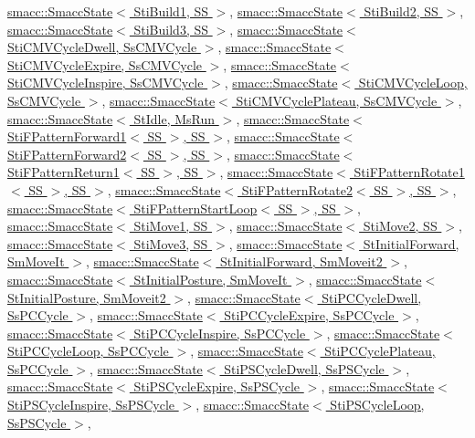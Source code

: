 \hyperlink{classsmacc_1_1SmaccState}{smacc\+::\+Smacc\+State$<$ Sti\+Build1, S\+S $>$}, \hyperlink{classsmacc_1_1SmaccState}{smacc\+::\+Smacc\+State$<$ Sti\+Build2, S\+S $>$}, \hyperlink{classsmacc_1_1SmaccState}{smacc\+::\+Smacc\+State$<$ Sti\+Build3, S\+S $>$}, \hyperlink{classsmacc_1_1SmaccState}{smacc\+::\+Smacc\+State$<$ Sti\+C\+M\+V\+Cycle\+Dwell, Ss\+C\+M\+V\+Cycle $>$}, \hyperlink{classsmacc_1_1SmaccState}{smacc\+::\+Smacc\+State$<$ Sti\+C\+M\+V\+Cycle\+Expire, Ss\+C\+M\+V\+Cycle $>$}, \hyperlink{classsmacc_1_1SmaccState}{smacc\+::\+Smacc\+State$<$ Sti\+C\+M\+V\+Cycle\+Inspire, Ss\+C\+M\+V\+Cycle $>$}, \hyperlink{classsmacc_1_1SmaccState}{smacc\+::\+Smacc\+State$<$ Sti\+C\+M\+V\+Cycle\+Loop, Ss\+C\+M\+V\+Cycle $>$}, \hyperlink{classsmacc_1_1SmaccState}{smacc\+::\+Smacc\+State$<$ Sti\+C\+M\+V\+Cycle\+Plateau, Ss\+C\+M\+V\+Cycle $>$}, \hyperlink{classsmacc_1_1SmaccState}{smacc\+::\+Smacc\+State$<$ St\+Idle, Ms\+Run $>$}, \hyperlink{classsmacc_1_1SmaccState}{smacc\+::\+Smacc\+State$<$ Sti\+F\+Pattern\+Forward1$<$ S\+S $>$, S\+S $>$}, \hyperlink{classsmacc_1_1SmaccState}{smacc\+::\+Smacc\+State$<$ Sti\+F\+Pattern\+Forward2$<$ S\+S $>$, S\+S $>$}, \hyperlink{classsmacc_1_1SmaccState}{smacc\+::\+Smacc\+State$<$ Sti\+F\+Pattern\+Return1$<$ S\+S $>$, S\+S $>$}, \hyperlink{classsmacc_1_1SmaccState}{smacc\+::\+Smacc\+State$<$ Sti\+F\+Pattern\+Rotate1$<$ S\+S $>$, S\+S $>$}, \hyperlink{classsmacc_1_1SmaccState}{smacc\+::\+Smacc\+State$<$ Sti\+F\+Pattern\+Rotate2$<$ S\+S $>$, S\+S $>$}, \hyperlink{classsmacc_1_1SmaccState}{smacc\+::\+Smacc\+State$<$ Sti\+F\+Pattern\+Start\+Loop$<$ S\+S $>$, S\+S $>$}, \hyperlink{classsmacc_1_1SmaccState}{smacc\+::\+Smacc\+State$<$ Sti\+Move1, S\+S $>$}, \hyperlink{classsmacc_1_1SmaccState}{smacc\+::\+Smacc\+State$<$ Sti\+Move2, S\+S $>$}, \hyperlink{classsmacc_1_1SmaccState}{smacc\+::\+Smacc\+State$<$ Sti\+Move3, S\+S $>$}, \hyperlink{classsmacc_1_1SmaccState}{smacc\+::\+Smacc\+State$<$ St\+Initial\+Forward, Sm\+Move\+It $>$}, \hyperlink{classsmacc_1_1SmaccState}{smacc\+::\+Smacc\+State$<$ St\+Initial\+Forward, Sm\+Moveit2 $>$}, \hyperlink{classsmacc_1_1SmaccState}{smacc\+::\+Smacc\+State$<$ St\+Initial\+Posture, Sm\+Move\+It $>$}, \hyperlink{classsmacc_1_1SmaccState}{smacc\+::\+Smacc\+State$<$ St\+Initial\+Posture, Sm\+Moveit2 $>$}, \hyperlink{classsmacc_1_1SmaccState}{smacc\+::\+Smacc\+State$<$ Sti\+P\+C\+Cycle\+Dwell, Ss\+P\+C\+Cycle $>$}, \hyperlink{classsmacc_1_1SmaccState}{smacc\+::\+Smacc\+State$<$ Sti\+P\+C\+Cycle\+Expire, Ss\+P\+C\+Cycle $>$}, \hyperlink{classsmacc_1_1SmaccState}{smacc\+::\+Smacc\+State$<$ Sti\+P\+C\+Cycle\+Inspire, Ss\+P\+C\+Cycle $>$}, \hyperlink{classsmacc_1_1SmaccState}{smacc\+::\+Smacc\+State$<$ Sti\+P\+C\+Cycle\+Loop, Ss\+P\+C\+Cycle $>$}, \hyperlink{classsmacc_1_1SmaccState}{smacc\+::\+Smacc\+State$<$ Sti\+P\+C\+Cycle\+Plateau, Ss\+P\+C\+Cycle $>$}, \hyperlink{classsmacc_1_1SmaccState}{smacc\+::\+Smacc\+State$<$ Sti\+P\+S\+Cycle\+Dwell, Ss\+P\+S\+Cycle $>$}, \hyperlink{classsmacc_1_1SmaccState}{smacc\+::\+Smacc\+State$<$ Sti\+P\+S\+Cycle\+Expire, Ss\+P\+S\+Cycle $>$}, \hyperlink{classsmacc_1_1SmaccState}{smacc\+::\+Smacc\+State$<$ Sti\+P\+S\+Cycle\+Inspire, Ss\+P\+S\+Cycle $>$}, \hyperlink{classsmacc_1_1SmaccState}{smacc\+::\+Smacc\+State$<$ Sti\+P\+S\+Cycle\+Loop, Ss\+P\+S\+Cycle $>$}, 